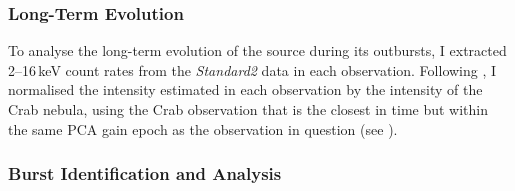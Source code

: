 \subsubsection{Long-Term Evolution}

\par To analyse the long-term evolution of the source during its outbursts, I extracted 2--16\,keV count rates from the \textit{Standard2} data in each observation.  Following \citet{Altamirano_CrabNorm}, I normalised the intensity estimated in each observation by the intensity of the Crab nebula, using the Crab observation that is the closest in time but within the same PCA gain epoch as the observation in question (see \citealp{Jahoda_Calibrate}).

\subsubsection{Burst Identification and Analysis}

\label{sec:burst_diff}

